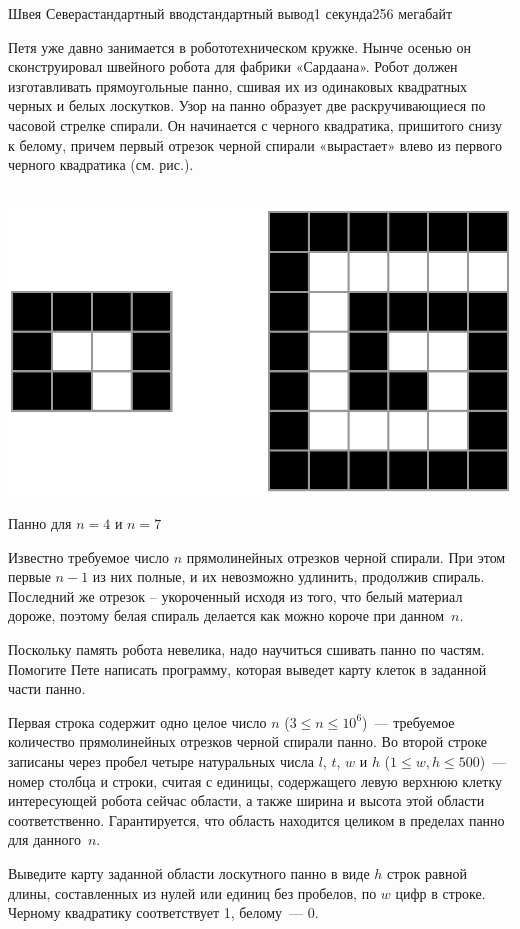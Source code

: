 \begin{problem}{Швея Севера}{стандартный ввод}{стандартный вывод}{1 секунда}{256 мегабайт}

Петя уже давно занимается в робототехническом кружке. Нынче осенью он 
сконструировал швейного робота для фабрики «Сардаана». Робот должен изготавливать прямоугольные панно, сшивая их из одинаковых квадратных черных и белых лоскутков. Узор на панно образует две раскручивающиеся по часовой стрелке спирали. Он начинается 
с черного квадратика, пришитого снизу к белому, причем первый отрезок черной спирали «вырастает» влево из первого черного квадратика (см. рис.). 
\\~

\noindent\medskip\centerline{
\includegraphics[bb=0 0 16.29cm 9.27cm, scale=.4]{loskut.pdf}
}
\centerline{Панно для $n = 4$ и $n = 7$}

Известно требуемое число $n$ прямолинейных отрезков черной спирали.  При этом первые $n-1$ из них полные, и их невозможно удлинить, продолжив спираль. Последний же отрезок -- укороченный исходя из того, что белый материал дороже, поэтому белая спираль делается как можно короче при данном~$n$.

Поскольку память робота невелика, надо научиться сшивать панно по частям. Помогите Пете написать программу, которая выведет карту клеток в заданной части панно.

\InputFile
Первая строка содержит одно целое число $n$ ($3 \leq n \leq 10^6$)~--- требуемое количество прямолинейных отрезков черной спирали панно.  Во второй строке записаны через пробел четыре натуральных числа $l$, $t$, $w$ и $h$ ($1 \leq w, h \leq 500$)~--- номер столбца и строки, считая с единицы, содержащего левую верхнюю клетку интересующей робота сейчас области, а также ширина и высота этой области соответственно. Гарантируется, что область находится целиком в пределах панно для данного~$n$.

\OutputFile
Выведите карту заданной области  лоскутного панно в виде $h$ строк равной длины, составленных из нулей или единиц без пробелов, по $w$ цифр в строке. Черному квадратику соответствует 1, белому~--- 0.

\Examples

\begin{example}
%
%
\end{example}

\end{problem}

